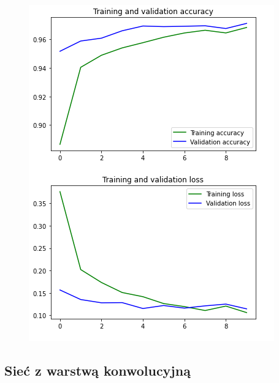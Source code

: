 \documentclass{article}
\begin{document}
\newpage
\begin{figure}[h]
  \centering
  \includegraphics[width=\linewidth]{mlp.png}
\end{figure}

\newpage
\subsection{Sieć z warstwą konwolucyjną}
\end{document}
